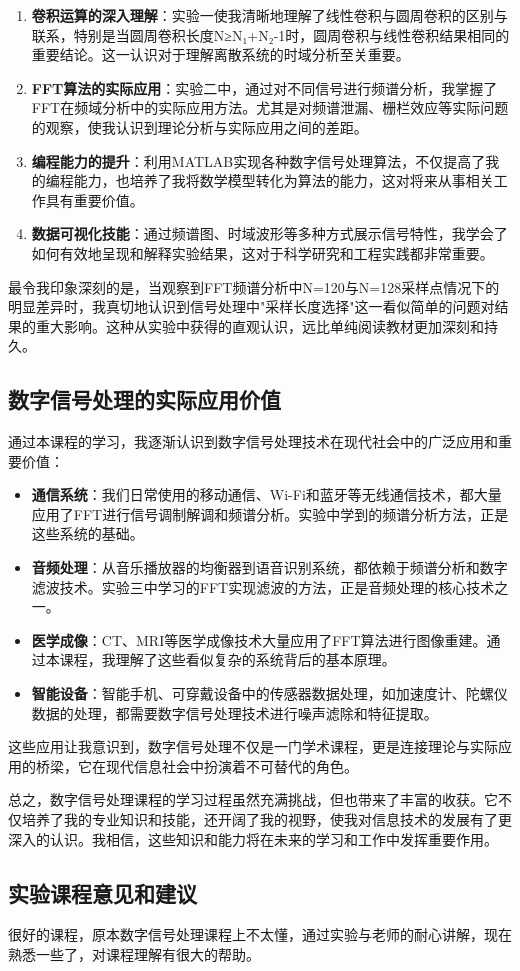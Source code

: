 \documentclass[12pt,hyperref,a4paper,UTF8]{ctexart}
\begin{document}
\begin{enumerate}
    \item \textbf{卷积运算的深入理解}：实验一使我清晰地理解了线性卷积与圆周卷积的区别与联系，特别是当圆周卷积长度N≥N₁+N₂-1时，圆周卷积与线性卷积结果相同的重要结论。这一认识对于理解离散系统的时域分析至关重要。
    
    \item \textbf{FFT算法的实际应用}：实验二中，通过对不同信号进行频谱分析，我掌握了FFT在频域分析中的实际应用方法。尤其是对频谱泄漏、栅栏效应等实际问题的观察，使我认识到理论分析与实际应用之间的差距。
    
    \item \textbf{编程能力的提升}：利用MATLAB实现各种数字信号处理算法，不仅提高了我的编程能力，也培养了我将数学模型转化为算法的能力，这对将来从事相关工作具有重要价值。
    
    \item \textbf{数据可视化技能}：通过频谱图、时域波形等多种方式展示信号特性，我学会了如何有效地呈现和解释实验结果，这对于科学研究和工程实践都非常重要。
\end{enumerate}

最令我印象深刻的是，当观察到FFT频谱分析中N=120与N=128采样点情况下的明显差异时，我真切地认识到信号处理中"采样长度选择"这一看似简单的问题对结果的重大影响。这种从实验中获得的直观认识，远比单纯阅读教材更加深刻和持久。

\subsection{数字信号处理的实际应用价值}

通过本课程的学习，我逐渐认识到数字信号处理技术在现代社会中的广泛应用和重要价值：

\begin{itemize}
    \item \textbf{通信系统}：我们日常使用的移动通信、Wi-Fi和蓝牙等无线通信技术，都大量应用了FFT进行信号调制解调和频谱分析。实验中学到的频谱分析方法，正是这些系统的基础。
    
    \item \textbf{音频处理}：从音乐播放器的均衡器到语音识别系统，都依赖于频谱分析和数字滤波技术。实验三中学习的FFT实现滤波的方法，正是音频处理的核心技术之一。
    
    \item \textbf{医学成像}：CT、MRI等医学成像技术大量应用了FFT算法进行图像重建。通过本课程，我理解了这些看似复杂的系统背后的基本原理。
    
    \item \textbf{智能设备}：智能手机、可穿戴设备中的传感器数据处理，如加速度计、陀螺仪数据的处理，都需要数字信号处理技术进行噪声滤除和特征提取。
\end{itemize}

这些应用让我意识到，数字信号处理不仅是一门学术课程，更是连接理论与实际应用的桥梁，它在现代信息社会中扮演着不可替代的角色。



总之，数字信号处理课程的学习过程虽然充满挑战，但也带来了丰富的收获。它不仅培养了我的专业知识和技能，还开阔了我的视野，使我对信息技术的发展有了更深入的认识。我相信，这些知识和能力将在未来的学习和工作中发挥重要作用。

\subsection{实验课程意见和建议}

很好的课程，原本数字信号处理课程上不太懂，通过实验与老师的耐心讲解，现在熟悉一些了，对课程理解有很大的帮助。
\end{document}
